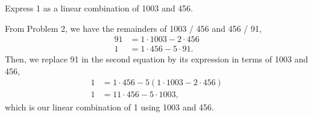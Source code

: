 \documentclass[../hw1]{subfiles}
\begin{document}
\begin{problem}[3]
Express 1 as a linear combination of 1003 and 456.
\end{problem}
From Problem 2, we have the remainders of 1003 / 456 and 456 / 91,
\begin{align*}
	91 & = 1\cdot 1003 - 2\cdot 456 \\
	1  & = 1\cdot 456 - 5\cdot 91
	.\end{align*}
Then, we replace 91 in the second equation by its expression in terms of 1003 and 456,
\begin{align*}
	1 & = 1\cdot 456 - 5 (1\cdot 1003 - 2\cdot 456) \\
	1 & = 11\cdot 456 - 5\cdot 1003
	,\end{align*}
which is our linear combination of 1 using 1003 and 456.
\end{document}
